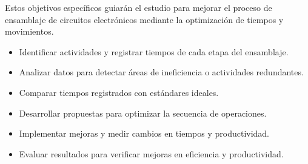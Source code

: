     Estos objetivos específicos guiarán el estudio para mejorar el proceso de ensamblaje de circuitos electrónicos mediante la optimización de tiempos y movimientos.
    \begin{itemize}
    \item \textbf{}Identificar actividades y registrar tiempos de cada etapa del ensamblaje.
    \item \textbf{}Analizar datos para detectar áreas de ineficiencia o actividades redundantes.
    \item \textbf{}Comparar tiempos registrados con estándares ideales.
    \item \textbf{}Desarrollar propuestas para optimizar la secuencia de operaciones.
    \item \textbf{}Implementar mejoras y medir cambios en tiempos y productividad.
    \item \textbf{}Evaluar resultados para verificar mejoras en eficiencia y productividad.
    \end{itemize}
    
    
